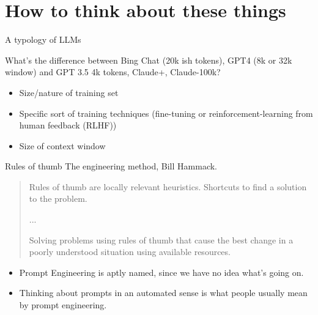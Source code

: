 \documentclass[aspectratio=169]{beamer}
\begin{document}
\section{How to think about these things}
\begin{frame}{A typology of LLMs}

What's the difference between Bing Chat (20k ish tokens), GPT4 (8k or 32k window) and GPT 3.5 4k tokens, Claude+, Claude-100k?

\begin{itemize}
    \item Size/nature of training set
    \item Specific sort of training techniques (fine-tuning or reinforcement-learning from human feedback (RLHF))
    \item Size of context window
\end{itemize}
    
\end{frame}
\begin{frame}{Rules of thumb}
   The engineering method, Bill Hammack.
   \begin{quote}
       Rules of thumb are locally relevant heuristics. Shortcuts to find a solution to the problem. \parencite[p 13]{Hammack2023-ra}
    
        ...
        
       Solving problems using rules of thumb that cause the best change in a poorly understood situation using available resources. \parencite[p 19]{Hammack2023-ra}
   \end{quote}
    \begin{itemize}
        \item Prompt Engineering is aptly named, since we have no idea what's going on.
        \item Thinking about prompts in an automated sense is what people usually mean by prompt engineering. 
    \end{itemize}
\end{frame}
\end{document}
